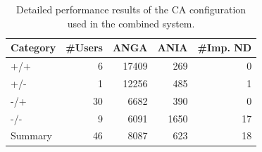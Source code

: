 \begin{table}[ht]
\centering
\begin{tabular}{lrrrr}
\hline
\textit{} Category & \#Users & ANGA & ANIA & \#Imp. ND \\ \hline
+/+ & 6  & 17409 & 269  & 0  \\
+/- & 1  & 12256 & 485  & 1  \\
-/+ & 30 & 6682  & 390  & 0  \\
-/- & 9  & 6091  & 1650 & 17 \\ \hline
Summary & 46 & 8087  & 623  & 18 \\ \hline
\end{tabular}
\caption{Detailed performance results of the CA configuration used in the combined system. }
\label{tab:CA-detailed-performance}
\end{table}



